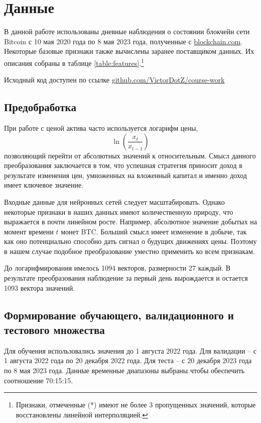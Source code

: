 \documentclass[diploma]{nanolab2015}
\begin{document}
\section{Данные}
В данной работе использованы дневные наблюдения о состоянии блокчейн сети Bitcoin с 10 мая 2020 года по 8 мая 2023 года, полученные с \href{https://www.blockchain.com/explorer/charts}{blockchain.com}. Некоторые базовые признаки также вычислены заранее поставщиком данных. Их описания собраны в таблице \ref{table:features}.\footnote{Признаки, отмеченные (*) имеют не более 3 пропущенных значений, которые восстановлены линейной интерполяцией.}

Исходный код доступен по ссылке \href{https://github.com/VictorDotZ/course-work}{github.com/VictorDotZ/course-work}

\subsection{Предобработка}
При работе с ценой актива часто используется логарифм цены,
$$
    \ln\left(\frac{x_{t}}{x_{t-1}}\right)
$$
позволяющий перейти от абсолютных значений к относительным. Смысл данного преобразования заключается в том, что успешная стратегия приносит доход в результате изменения цен, умноженных на вложенный капитал и именно доход имеет ключевое значение.

Входные данные для нейронных сетей следует масштабировать. Однако некоторые признаки в наших данных имеют количественную природу, что выражается в почти линейном росте. Например, абсолютное значение добытых на момент времени $t$ монет BTC. Больший смысл имеет изменение в добыче, так как оно потенциально способно дать сигнал о будущих движениях цены. Поэтому в нашем случае подобное преобразование уместно применить ко всем признакам.

До логарифмирования имелось 1094 векторов, размерности 27 каждый. В результате преобразования наблюдение за первый день вырождается и остается 1093 вектора значений.

\subsection{Формирование обучающего, валидационного и тестового множества}
Для обучения использовались значения до 1 августа 2022 года. Для валидации -- с 1 августа 2022 года по 20 декабря 2022 года. Для теста -- с 20 декабря 2023 года по 8 мая 2023 года. Данные временные диапазоны выбраны чтобы обеспечить соотношение 70:15:15.
\end{document}
